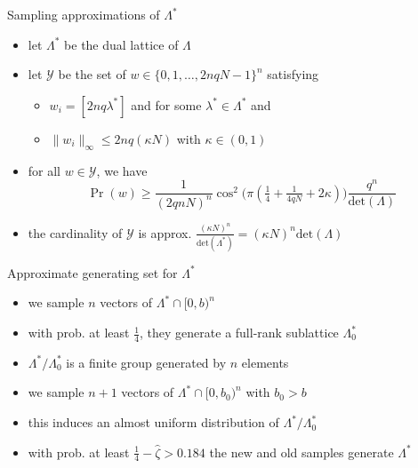 \documentclass[slideColor]{prosper}
\renewcommand{\>}{\rangle}
\newcommand{\<}{\langle}
\begin{document}

\begin{slide}{Sampling approximations of $\Lambda^*$}

\begin{itemize}
\item let $\Lambda^*$ be the dual lattice of $\Lambda$

\medskip
\item let $\mathcal{Y}$ be the set of $w\in\{0,1,\ldots,2nqN-1\}^n$ satisfying

\medskip
\begin{itemize}
\item $w_i = [2n q \lambda^*]$ and for some $\lambda^*\in\Lambda^*$ and 

\medskip
\item $\|w_i \|_\infty \le 2n q (\kappa N)$ with $\kappa\in (0,1)$
\end{itemize}

\medskip
\item for all $w\in\mathcal{Y}$, we have
\[
\Pr(w) \ge \frac{1}{(2qnN)^n} \cos^2\big( \pi (\tfrac{1}{4} + \tfrac{1}{4qN} + 2\kappa) \big) \frac{q^n}{\mathrm{det}(\Lambda)}
\]

\medskip
\item the cardinality of $\mathcal{Y}$ is approx. $\tfrac{(\kappa N)^n}{\mathrm{det}(\Lambda^*)} = (\kappa N)^n \mathrm{det}(\Lambda)$

\end{itemize}

\end{slide}


\begin{slide}{Approximate generating set for $\Lambda^*$}
\begin{itemize}
\item we sample $n$ vectors of $\Lambda^* \cap [0,b)^n$ 

\medskip
\item with prob. at least $\tfrac{1}{4}$, they generate a full-rank sublattice $\Lambda^*_0$

\medskip
\item $\Lambda^*/\Lambda^*_0$ is a finite group generated by $n$ elements

\medskip
\item we sample $n+1$ vectors of $\Lambda^* \cap [0,b_0)^n$ with $b_0 > b$

\medskip
\item this induces an almost uniform distribution of $\Lambda^*/\Lambda^*_0$

\medskip
\item with prob. at least $\frac{1}{4}-\hat{\zeta}>0.184$ the new and old samples generate $\Lambda^*$ 

\end{itemize}

\end{slide}
\end{document}
